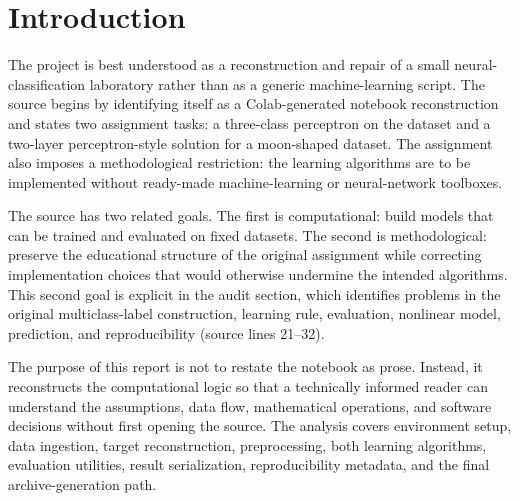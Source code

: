 \documentclass[11pt,a4paper]{article}
\newcommand{\code}[1]{\texttt{\detokenize{#1}}}
\begin{document}
\section{Introduction}
The project is best understood as a reconstruction and repair of a small neural-classification laboratory rather than as a generic machine-learning script. The source begins by identifying itself as a Colab-generated notebook reconstruction and states two assignment tasks: a three-class perceptron on the \code{testX} dataset and a two-layer perceptron-style solution for a moon-shaped dataset. The assignment also imposes a methodological restriction: the learning algorithms are to be implemented without ready-made machine-learning or neural-network toolboxes. 

The source has two related goals. The first is computational: build models that can be trained and evaluated on fixed datasets. The second is methodological: preserve the educational structure of the original assignment while correcting implementation choices that would otherwise undermine the intended algorithms. This second goal is explicit in the audit section, which identifies problems in the original multiclass-label construction, learning rule, evaluation, nonlinear model, prediction, and reproducibility (source lines 21--32).

The purpose of this report is not to restate the notebook as prose. Instead, it reconstructs the computational logic so that a technically informed reader can understand the assumptions, data flow, mathematical operations, and software decisions without first opening the source. The analysis covers environment setup, data ingestion, target reconstruction, preprocessing, both learning algorithms, evaluation utilities, result serialization, reproducibility metadata, and the final archive-generation path.
\end{document}
